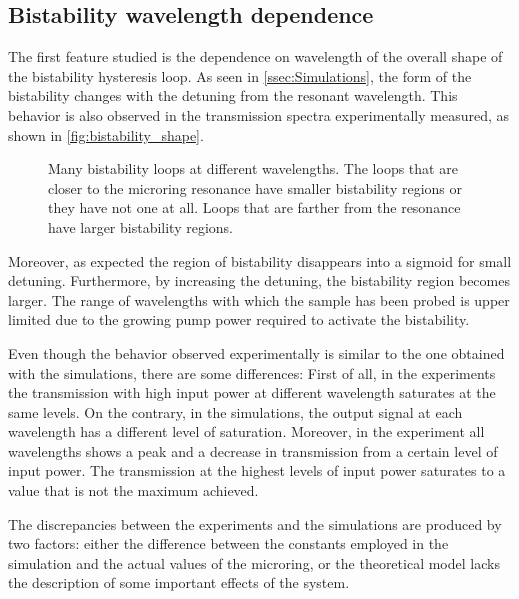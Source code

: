 
\subsection{Bistability wavelength dependence}
\label{ssec:bistability_wavelength_dependence}
The first feature studied is the dependence on wavelength of the overall shape of the bistability hysteresis loop.
As seen in \autoref{ssec:Simulations}, the form of the bistability changes with the detuning from the resonant wavelength.
This behavior is also observed in the transmission spectra experimentally measured, as shown in \autoref{fig:bistability_shape}.

\begin{figure}[hbtp]
	\centering
	
	\caption{Many bistability loops at different wavelengths.
		The loops that are closer to the microring resonance have smaller bistability regions or they have not one at all.
		Loops that are farther from the resonance have larger bistability regions.}
	\label{fig:bistability_shape}
\end{figure}

Moreover, as expected the region of bistability disappears into a sigmoid for small detuning.
Furthermore, by increasing the detuning, the bistability region becomes larger.
The range of wavelengths with which the sample has been probed is upper limited due to the growing pump power required to activate the bistability.

Even though the behavior observed experimentally is similar to the one obtained with the simulations, there are some differences:
First of all, in the experiments the transmission with high input power at different wavelength saturates at the same levels.
On the contrary, in the simulations, the output signal at each wavelength has a different level of saturation.
Moreover, in the experiment all wavelengths shows a peak and a decrease in transmission from a certain level of input power.
The transmission at the highest levels of input power saturates to a value that is not the maximum achieved.

The discrepancies between the experiments and the simulations are produced by two factors: either the difference between the constants employed in the simulation and the actual values of the microring, or the theoretical model lacks the description of some important effects of the system.

